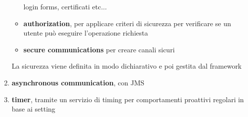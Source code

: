 \documentclass[a4paper,12pt, oneside]{book}
\begin{document}
\begin{enumerate}
\begin{itemize}
    login forms, certificati etc$\ldots$
    \item \textbf{authorization}, per applicare criteri di sicurezza per
    verificare se un utente può eseguire l'operazione richiesta 
    \item \textbf{secure communications} per creare canali sicuri
  \end{itemize}
  La sicurezza viene definita in modo dichiarativo e poi gestita dal framework
  \item \textbf{asynchronous communication}, con JMS
  \item \textbf{timer}, tramite un servizio di timing per comportamenti
  proattivi regolari in base ai setting
\end{enumerate}
\end{document}
